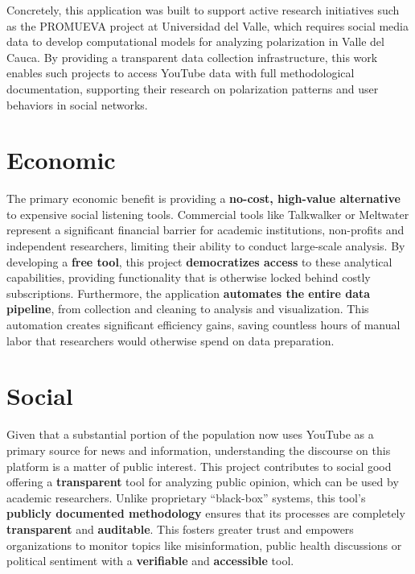 Concretely, this application was built to support active research initiatives such as the PROMUEVA project at Universidad del Valle, which requires social media data to develop computational models for analyzing polarization in Valle del Cauca. By providing a transparent data collection infrastructure, this work enables such projects to access YouTube data with full methodological documentation, supporting their research on polarization patterns and user behaviors in social networks.

\section{Economic}

The primary economic benefit is providing a \textbf{no-cost, high-value alternative} to expensive social listening tools. Commercial tools like Talkwalker or Meltwater represent a significant financial barrier for academic institutions, non-profits and independent researchers, limiting their ability to conduct large-scale analysis. By developing a \textbf{free tool}, this project \textbf{democratizes access} to these analytical capabilities, providing functionality that is otherwise locked behind costly subscriptions. Furthermore, the application \textbf{automates the entire data pipeline}, from collection and cleaning to analysis and visualization. This automation creates significant efficiency gains, saving countless hours of manual labor that researchers would otherwise spend on data preparation.

\section{Social}

Given that a substantial portion of the population now uses YouTube as a primary source for news and information, understanding the discourse on this platform is a matter of public interest. This project contributes to social good offering a \textbf{transparent} tool for analyzing public opinion, which can be used by academic researchers. Unlike proprietary \enquote{black-box} systems, this tool's \textbf{publicly documented methodology} ensures that its processes are completely \textbf{transparent} and \textbf{auditable}. This fosters greater trust and empowers organizations to monitor topics like misinformation, public health discussions or political sentiment with a \textbf{verifiable} and \textbf{accessible} tool.
